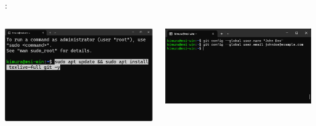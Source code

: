 \documentclass[aspectratio=169,dvipdfmx,cjk]{beamer}
\begin{document}
\begin{frame}{\insertsection \thesubsection: \insertsubsection}
\begin{columns}
\begin{column}{0.3\textwidth}
      \includegraphics[width=1.0\linewidth]{fig/texlive.png}
    \end{column}
    \begin{column}{0.35\textwidth}
      \includegraphics[width=1.0\linewidth]{fig/git-config.png}
    \end{column}
  \end{columns}
\end{frame}
\end{document}
